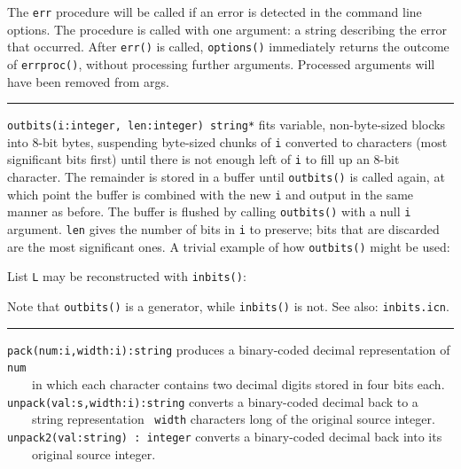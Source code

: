 The \texttt{err} procedure will be called if an error is detected in the
command line options. The procedure is called with one argument: a
string describing the error that occurred. After \texttt{err()} is
called, \texttt{options()} immediately returns the outcome of
\texttt{errproc()}, without processing further arguments.
Processed arguments will have been removed from args.

\vspace{0.25cm}\hrule{}

\texttt{outbits(i:integer, len:integer) string*} fits variable,
non-byte-sized blocks into 8-bit bytes,
suspending byte-sized chunks of \texttt{i} converted to characters
(most significant bits first) until there is not enough left of
\texttt{i} to fill up an 8-bit character. The remainder is
stored in a buffer until \texttt{outbits()} is called again, at which
point the buffer is combined with the new \texttt{i} and output in
the same manner as before. The buffer is flushed by calling
\texttt{outbits()} with a null \texttt{i} argument. 
\texttt{len} gives the number of bits in \texttt{i} to preserve;
bits that are discarded are the most significant ones. A trivial
example of how \texttt{outbits()} might be used:


\noindent List \texttt{L} may be reconstructed with \texttt{inbits()}:


\noindent Note that \texttt{outbits()} is a generator, while
\texttt{inbits()} is not.
See also: \texttt{inbits.icn}.

\vspace{0.25cm}\hrule{}

\texttt{pack(num:i,width:i):string} produces a binary-coded decimal
representation of \texttt{num}\\
 \ \ \ \  in which each character contains two decimal
digits stored in four bits each.\\
\texttt{unpack(val:s,width:i):string} converts a binary-coded decimal
back to a\\
 \ \ \ \ string representation \ \texttt{width} characters long of the
original source integer.\\
\texttt{unpack2(val:string) : integer} converts a binary-coded decimal
back into its\\
 \ \ \ \ original source integer.

